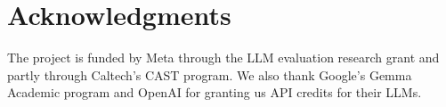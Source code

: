 \section*{Acknowledgments}
The project is funded by Meta through the LLM evaluation research grant and partly through Caltech's CAST program.
We also thank Google's Gemma Academic program and OpenAI for granting us API credits for their LLMs.